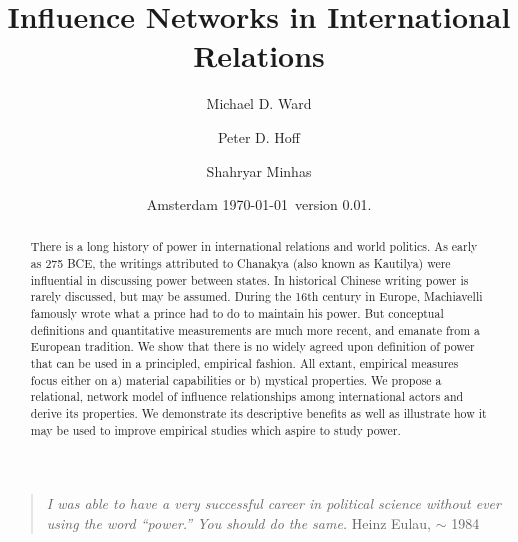 \documentclass[12pt,oneside,doublespace,pdflatex]{amsart}
\date{Amsterdam \today~version 0.01.}
\begin{document}
\title[Not Power]{Influence Networks in International Relations}

\author{Michael D. Ward}
\address{Michael D. Ward: Department of Political Science, Duke University, Durham, NC, USA, 27707\\}
 
\author{Peter D. Hoff}
\address{Peter D. Hoff: Department of Statistics, University of Washington, Seattle, WA, USA, 98195}

\author{Shahryar Minhas}
\address{Shahryar Minhas: Department of Political Science, Duke University, Durham, NC, USA, 27707\\}

\begin{abstract}
There is a long history of power in international relations and world politics. As early as 275 BCE, the writings attributed to Chanakya (also known as Kautilya) were influential in discussing power between states.  In historical Chinese writing power is rarely discussed, but may be assumed. During the 16th century in Europe, Machiavelli famously wrote what a prince had to do to maintain his power. But conceptual definitions and quantitative measurements are much more recent, and emanate from a European tradition.  We show that there is no widely agreed upon definition of power that can be used in a principled, empirical fashion.  All extant, empirical measures focus either on a) material capabilities or b) mystical properties. We propose a relational, network model of influence relationships among international actors and derive its properties. We demonstrate its descriptive benefits as well as illustrate how it may be used to improve empirical studies which aspire to study power.
\end{abstract}
 
\pagestyle{fancy} \chead{} \rhead{}
  \rfoot{}

\maketitle

\begin{quote} {\em
I was able to have a very successful career in political science without ever using the word ``power.'' You should do the same.}  Heinz Eulau,  $\sim$ 1984
\end{quote}
\end{document}
